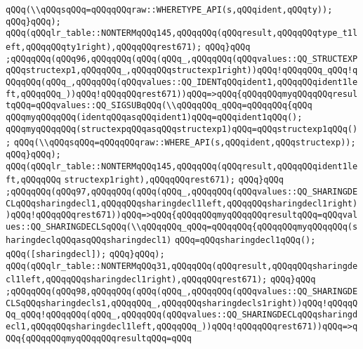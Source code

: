 \verb|qQQq(\\qQQqsqQQq=qQQqqQQqraw::WHERETYPE_API(s,qQQqident,qQQqty));|\newline
\verb|qQQq}qQQq);|\newline
\verb|qQQq(qQQqlr_table::NONTERMqQQq145,qQQqqQQq(qQQqresult,qQQqqQQqtype_t1left,qQQqqQQqty1right),qQQqqQQqrest671);|\newline
\verb|qQQq}qQQq|\newline
\verb|;qQQqqQQq(qQQq96,qQQqqQQq(qQQq(qQQq_,qQQqqQQq(qQQqvalues::QQ_STRUCTEXPqQQqstructexp1,qQQqqQQq_,qQQqqQQqstructexp1right))qQQq!qQQqqQQq_qQQq!qQQqqQQq(qQQq_,qQQqqQQq(qQQqvalues::QQ_IDENTqQQqident1,qQQqqQQqident1left,qQQqqQQq_))qQQq!qQQqqQQqrest671))qQQq=>qQQq{qQQqqQQqmyqQQqqQQqresultqQQq=qQQqvalues::QQ_SIGSUBqQQq(\\qQQqqQQq_qQQq=qQQqqQQq{qQQq|\newline
\verb|qQQqmyqQQqqQQq(identqQQqasqQQqident1)qQQq=qQQqident1qQQq();|\newline
\verb|qQQqmyqQQqqQQq(structexpqQQqasqQQqstructexp1)qQQq=qQQqstructexp1qQQq();|\newline
\verb|qQQq(\\qQQqsqQQq=qQQqqQQqraw::WHERE_API(s,qQQqident,qQQqstructexp));|\newline
\verb|qQQq}qQQq);|\newline
\verb|qQQq(qQQqlr_table::NONTERMqQQq145,qQQqqQQq(qQQqresult,qQQqqQQqident1left,qQQqqQQq|\newline
\verb|structexp1right),qQQqqQQqrest671);|\newline
\verb|qQQq}qQQq|\newline
\verb|;qQQqqQQq(qQQq97,qQQqqQQq(qQQq(qQQq_,qQQqqQQq(qQQqvalues::QQ_SHARINGDECLqQQqsharingdecl1,qQQqqQQqsharingdecl1left,qQQqqQQqsharingdecl1right))qQQq!qQQqqQQqrest671))qQQq=>qQQq{qQQqqQQqmyqQQqqQQqresultqQQq=qQQqvalues::QQ_SHARINGDECLSqQQq(\\qQQqqQQq_qQQq=qQQqqQQq{qQQqqQQqmyqQQqqQQq(sharingdeclqQQqasqQQqsharingdecl1)|\newline
\verb|qQQq=qQQqsharingdecl1qQQq();|\newline
\verb|qQQq([sharingdecl]);|\newline
\verb|qQQq}qQQq);|\newline
\verb|qQQq(qQQqlr_table::NONTERMqQQq31,qQQqqQQq(qQQqresult,qQQqqQQqsharingdecl1left,qQQqqQQqsharingdecl1right),qQQqqQQqrest671);|\newline
\verb|qQQq}qQQq|\newline
\verb|;qQQqqQQq(qQQq98,qQQqqQQq(qQQq(qQQq_,qQQqqQQq(qQQqvalues::QQ_SHARINGDECLSqQQqsharingdecls1,qQQqqQQq_,qQQqqQQqsharingdecls1right))qQQq!qQQqqQQq_qQQq!qQQqqQQq(qQQq_,qQQqqQQq(qQQqvalues::QQ_SHARINGDECLqQQqsharingdecl1,qQQqqQQqsharingdecl1left,qQQqqQQq_))qQQq!qQQqqQQqrest671))qQQq=>qQQq{qQQqqQQqmyqQQqqQQqresultqQQq=qQQq|\newline
